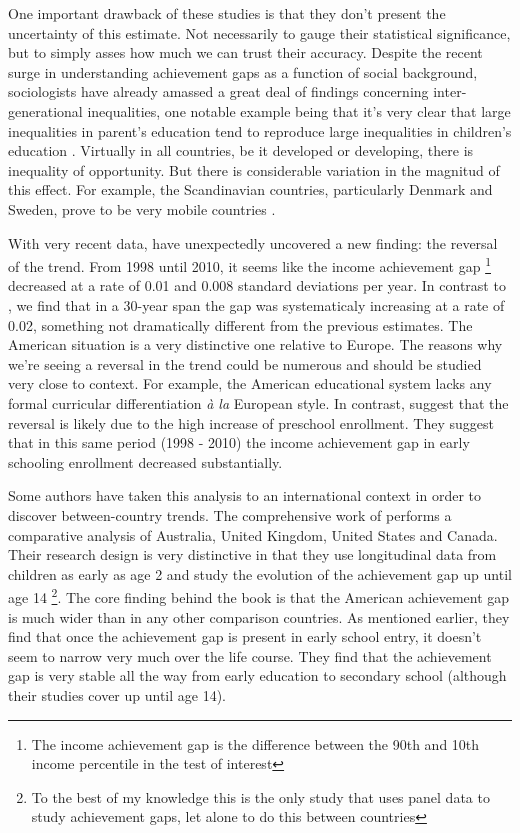 \documentclass[11pt, a4paper]{article}\usepackage[]{graphicx}\usepackage[]{color}
\begin{document}
One important drawback of these studies is that they don't present the uncertainty of this estimate. Not necessarily to gauge their statistical significance, but to simply asses how much we can trust their accuracy. Despite the recent surge in understanding achievement gaps as a function of social background, sociologists have already amassed a great deal of findings concerning inter-generational inequalities, one notable example being that it's very clear that large inequalities in parent's education tend to reproduce large inequalities in children's education \citep{breen2007}. Virtually in all countries, be it developed or developing, there is inequality of opportunity. But there is considerable variation in the magnitud of this effect. For example, the Scandinavian countries, particularly Denmark and Sweden, prove to be very mobile countries \citep{esping2012, breen2007, shavit1993}.

With very recent data, \citet{reardon_portilla} have unexpectedly uncovered a new finding: the reversal of the trend. From 1998 until 2010, it seems like the income achievement gap \footnote{The income achievement gap is the difference between the 90th and 10th income percentile in the test of interest} decreased at a rate of 0.01 and 0.008 standard deviations per year. In contrast to \citep{reardon2011}, we find that in a 30-year span the gap was systematicaly increasing at a rate of 0.02, something not dramatically different from the previous estimates. The American situation is a very distinctive one relative to Europe. The reasons why we're seeing a reversal in the trend could be numerous and should be studied very close to context. For example, the American educational system lacks any formal curricular differentiation \emph{à la} European style. In contrast, \citet{reardon2011} suggest that the reversal is likely due to the high increase of preschool enrollment. They suggest that in this same period (1998 - 2010) the income achievement gap in early schooling enrollment decreased substantially.

Some authors have taken this analysis to an international context in order to discover between-country trends. The comprehensive work of \citet{bradbury2015} performs a comparative analysis of Australia, United Kingdom, United States and Canada. Their research design is very distinctive in that they use longitudinal data from children as early as age 2 and study the evolution of the achievement gap up until age 14 \footnote{To the best of my knowledge this is the only study that uses panel data to study achievement gaps, let alone to do this between countries}. The core finding behind the book is that the American achievement gap is much wider than in any other comparison countries. As mentioned earlier, they find that once the achievement gap is present in early school entry, it doesn't seem to narrow very much over the life course. They find that the achievement gap is very stable all the way from early education to secondary school (although their studies cover up until age 14). 
\end{document}

